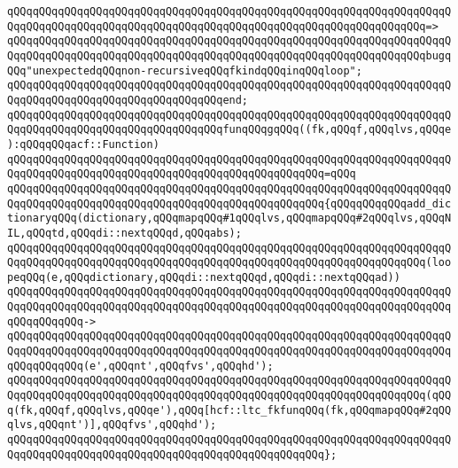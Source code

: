 \verb|qQQqqQQqqQQqqQQqqQQqqQQqqQQqqQQqqQQqqQQqqQQqqQQqqQQqqQQqqQQqqQQqqQQqqQQqqQQqqQQqqQQqqQQqqQQqqQQqqQQqqQQqqQQqqQQqqQQqqQQqqQQqqQQqqQQqqQQq=>|\newline
\verb|qQQqqQQqqQQqqQQqqQQqqQQqqQQqqQQqqQQqqQQqqQQqqQQqqQQqqQQqqQQqqQQqqQQqqQQqqQQqqQQqqQQqqQQqqQQqqQQqqQQqqQQqqQQqqQQqqQQqqQQqqQQqqQQqqQQqqQQqbugqQQq"unexpectedqQQqnon-recursiveqQQqfkindqQQqinqQQqloop";|\newline
\verb|qQQqqQQqqQQqqQQqqQQqqQQqqQQqqQQqqQQqqQQqqQQqqQQqqQQqqQQqqQQqqQQqqQQqqQQqqQQqqQQqqQQqqQQqqQQqqQQqqQQqqQQqend;|\newline
\newline
\verb|qQQqqQQqqQQqqQQqqQQqqQQqqQQqqQQqqQQqqQQqqQQqqQQqqQQqqQQqqQQqqQQqqQQqqQQqqQQqqQQqqQQqqQQqqQQqqQQqqQQqqQQqfunqQQqgqQQq((fk,qQQqf,qQQqlvs,qQQqe):qQQqqQQqacf::Function)|\newline
\verb|qQQqqQQqqQQqqQQqqQQqqQQqqQQqqQQqqQQqqQQqqQQqqQQqqQQqqQQqqQQqqQQqqQQqqQQqqQQqqQQqqQQqqQQqqQQqqQQqqQQqqQQqqQQqqQQqqQQqqQQq=qQQq|\newline
\verb|qQQqqQQqqQQqqQQqqQQqqQQqqQQqqQQqqQQqqQQqqQQqqQQqqQQqqQQqqQQqqQQqqQQqqQQqqQQqqQQqqQQqqQQqqQQqqQQqqQQqqQQqqQQqqQQqqQQqqQQq{qQQqqQQqqQQqadd_dictionaryqQQq(dictionary,qQQqmapqQQq#1qQQqlvs,qQQqmapqQQq#2qQQqlvs,qQQqNIL,qQQqtd,qQQqdi::nextqQQqd,qQQqabs);|\newline
\newline
\verb|qQQqqQQqqQQqqQQqqQQqqQQqqQQqqQQqqQQqqQQqqQQqqQQqqQQqqQQqqQQqqQQqqQQqqQQqqQQqqQQqqQQqqQQqqQQqqQQqqQQqqQQqqQQqqQQqqQQqqQQqqQQqqQQqqQQqqQQq(loopeqQQq(e,qQQqdictionary,qQQqdi::nextqQQqd,qQQqdi::nextqQQqad))|\newline
\verb|qQQqqQQqqQQqqQQqqQQqqQQqqQQqqQQqqQQqqQQqqQQqqQQqqQQqqQQqqQQqqQQqqQQqqQQqqQQqqQQqqQQqqQQqqQQqqQQqqQQqqQQqqQQqqQQqqQQqqQQqqQQqqQQqqQQqqQQqqQQqqQQqqQQqqQQq->|\newline
\verb|qQQqqQQqqQQqqQQqqQQqqQQqqQQqqQQqqQQqqQQqqQQqqQQqqQQqqQQqqQQqqQQqqQQqqQQqqQQqqQQqqQQqqQQqqQQqqQQqqQQqqQQqqQQqqQQqqQQqqQQqqQQqqQQqqQQqqQQqqQQqqQQqqQQqqQQq(e',qQQqnt',qQQqfvs',qQQqhd');|\newline
\newline
\verb|qQQqqQQqqQQqqQQqqQQqqQQqqQQqqQQqqQQqqQQqqQQqqQQqqQQqqQQqqQQqqQQqqQQqqQQqqQQqqQQqqQQqqQQqqQQqqQQqqQQqqQQqqQQqqQQqqQQqqQQqqQQqqQQqqQQqqQQq(qQQq(fk,qQQqf,qQQqlvs,qQQqe'),qQQq[hcf::ltc_fkfunqQQq(fk,qQQqmapqQQq#2qQQqlvs,qQQqnt')],qQQqfvs',qQQqhd');|\newline
\verb|qQQqqQQqqQQqqQQqqQQqqQQqqQQqqQQqqQQqqQQqqQQqqQQqqQQqqQQqqQQqqQQqqQQqqQQqqQQqqQQqqQQqqQQqqQQqqQQqqQQqqQQqqQQqqQQqqQQqqQQq};|\newline
